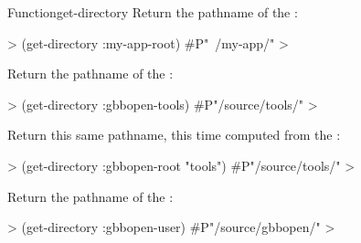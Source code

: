\documentclass[10pt,twoside,english,pdftex]{article}
\begin{document}
\begin{functiondoc}{Function}{get-directory}{
     
    \returns{} }
Return the pathname of the  :
%
\W\supp
\begin{example}
  > (get-directory :my-app-root)
  #P"~/my-app/"
  >
\end{example}
%
Return the pathname of the 
:
%
\W\supp\notpretop
\begin{example}
  > (get-directory :gbbopen-tools)
  #P"/source/tools/"
  >
\end{example}
Return this same pathname, this time computed from the
 :
%
\W\supp\notpretop
\begin{example}
  > (get-directory :gbbopen-root "tools")
  #P"/source/tools/" 
  >
\end{example}
%
Return the pathname of the  :
%
\W\supp\notpretop
\begin{example}
  > (get-directory :gbbopen-user)
  #P"/source/gbbopen/"
  >
\end{example}

\end{functiondoc}

\end{document}
